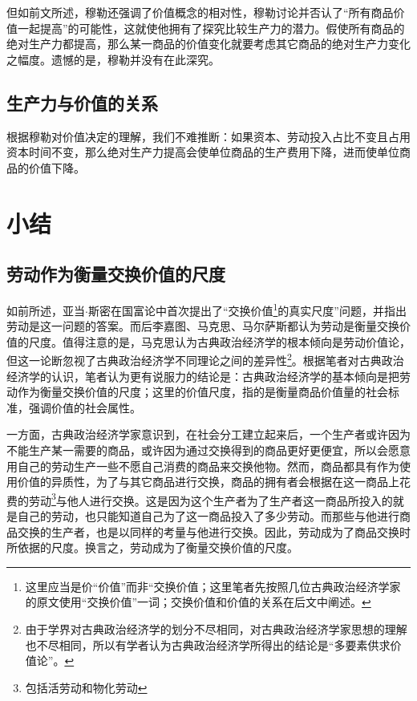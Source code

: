 但如前文所述，穆勒还强调了价值概念的相对性，穆勒讨论并否认了“所有商品价值一起提高”的可能性，这就使他拥有了探究比较生产力的潜力。假使所有商品的绝对生产力都提高，那么某一商品的价值变化就要考虑其它商品的绝对生产力变化之幅度。遗憾的是，穆勒并没有在此深究。

\subsection{生产力与价值的关系}

根据穆勒对价值决定的理解，我们不难推断：如果资本、劳动投入占比不变且占用资本时间不变，那么绝对生产力提高会使单位商品的生产费用下降，进而使单位商品的价值下降。

\section{小结}

\subsection{劳动作为衡量交换价值的尺度}

如前所述，亚当$\cdot$斯密在国富论中首次提出了“交换价值\footnote{这里应当是价“价值”而非“交换价值；这里笔者先按照几位古典政治经济学家的原文使用“交换价值”一词；交换价值和价值的关系在后文中阐述。}的真实尺度”问题，并指出劳动是这一问题的答案。而后李嘉图、马克思、马尔萨斯都认为劳动是衡量交换价值的尺度。值得注意的是，马克思认为古典政治经济学的根本倾向是劳动价值论，但这一论断忽视了古典政治经济学不同理论之间的差异性\footnote{由于学界对古典政治经济学的划分不尽相同，对古典政治经济学家思想的理解也不尽相同，所以有学者认为古典政治经济学所得出的结论是“多要素供求价值论”\cite[179]{CaiJiMingCongGuDianZhengZhiJingJiXueDaoZhongGuoTeSeSheHuiZhuYiZhengZhiJingJiXueJiYuZhongGuoShiJiaoDeZhengZhiJingJiXueYanBianShangCe2023}。}。根据笔者对古典政治经济学的认识，笔者认为更有说服力的结论是：古典政治经济学的基本倾向是把劳动作为衡量交换价值的尺度；这里的价值尺度，指的是衡量商品价值量的社会标准，强调价值的社会属性。

一方面，古典政治经济学家意识到，在社会分工建立起来后，一个生产者或许因为不能生产某一需要的商品，或许因为通过交换得到的商品更好更便宜，所以会愿意用自己的劳动生产一些不愿自己消费的商品来交换他物。然而，商品都具有作为使用价值的异质性，为了与其它商品进行交换，商品的拥有者会根据在这一商品上花费的劳动\footnote{包括活劳动和物化劳动}与他人进行交换。这是因为这个生产者为了生产者这一商品所投入的就是自己的劳动，也只能知道自己为了这一商品投入了多少劳动。而那些与他进行商品交换的生产者，也是以同样的考量与他进行交换。因此，劳动成为了商品交换时所依据的尺度。换言之，劳动成为了衡量交换价值的尺度。\cite[1016-1017]{ZhongGongZhongYangMaKeSiEnGeSiLieNingSiDaLinZhuZuoBianYiJuMaKeSiEnGeSiWenJiDi7Juan2009}\cite[25]{YaDang*SiMiGuoFuLun2015}\cite[133]{MaErSaSiZhengZhiJingJiXueDingYi2023}

